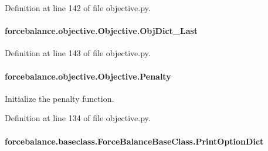 Definition at line 142 of file objective.\-py.

\hypertarget{classforcebalance_1_1objective_1_1Objective_a86263748baa5017d4dc1c3a824d7382e}{
\paragraph[{Obj\-Dict\-\_\-\-Last}]{\setlength{\rightskip}{0pt plus 5cm}forcebalance.\-objective.\-Objective.\-Obj\-Dict\-\_\-\-Last}}\label{classforcebalance_1_1objective_1_1Objective_a86263748baa5017d4dc1c3a824d7382e}


Definition at line 143 of file objective.\-py.

\hypertarget{classforcebalance_1_1objective_1_1Objective_aafb2228e87f0e3647b2e4be0678d76ba}{
\paragraph[{Penalty}]{\setlength{\rightskip}{0pt plus 5cm}forcebalance.\-objective.\-Objective.\-Penalty}}\label{classforcebalance_1_1objective_1_1Objective_aafb2228e87f0e3647b2e4be0678d76ba}


Initialize the penalty function. 



Definition at line 134 of file objective.\-py.

\hypertarget{classforcebalance_1_1baseclass_1_1ForceBalanceBaseClass_a5c55e661e746d1a4443f4e0bc34ebe05}{
\paragraph[{Print\-Option\-Dict}]{\setlength{\rightskip}{0pt plus 5cm}forcebalance.\-baseclass.\-Force\-Balance\-Base\-Class.\-Print\-Option\-Dict\hspace{0.3cm}{\ttfamily [inherited]}}}\label{classforcebalance_1_1baseclass_1_1ForceBalanceBaseClass_a5c55e661e746d1a4443f4e0bc34ebe05}


